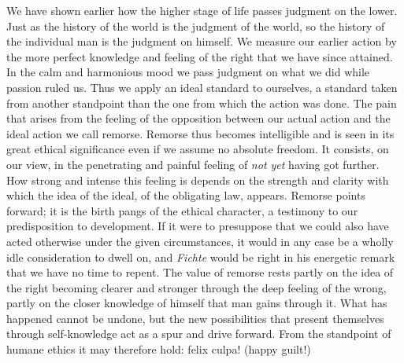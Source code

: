 \documentclass[12pt,a4paper,openany]{book}
\newcommand{\opage}[1]{\marginnote{\footnotesize\textit{[#1]}}}
\begin{document}
We have shown earlier how the higher stage of life passes judgment on the
lower. Just as the history of the world is the judgment of the world, so the
history of the individual man is the judgment on himself. We measure our
earlier action by the more perfect knowledge and feeling of the right that we
have since attained. In the calm and harmonious mood we pass judgment on what
we did while passion ruled us. Thus we apply an ideal standard to ourselves, a
standard taken from another standpoint than the one from which the action was
done. The pain that arises from the feeling \opage{124}of the opposition
between our actual action and the ideal action we call remorse. Remorse thus
becomes intelligible and is seen in its great ethical significance even if we
assume no absolute freedom. It consists, on our view, in the penetrating and
painful feeling of \emph{not yet} having got further. How strong and intense
this feeling is depends on the strength and clarity with which the idea of the
ideal, of the obligating law, appears. Remorse points forward; it is the birth
pangs of the ethical character, a testimony to our predisposition to
development. If it were to presuppose that we could also have acted otherwise
under the given circumstances, it would in any case be a wholly idle
consideration to dwell on, and \emph{Fichte} would be right in his energetic
remark that we have no time to repent. The value of remorse rests partly on
the idea of the right becoming clearer and stronger through the deep feeling
of the wrong, partly on the closer knowledge of himself that man gains through
it. What has happened cannot be undone, but the new possibilities that present
themselves through self-knowledge act as a spur and drive forward. From the
standpoint of humane ethics it may therefore hold: felix culpa! (happy guilt!)
\end{document}
